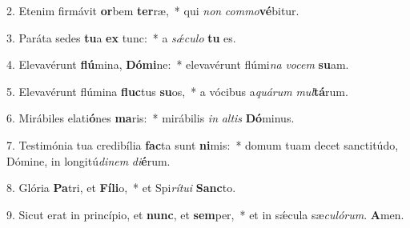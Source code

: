 2. Etenim firmávit \textbf{or}bem \textbf{ter}ræ,~*  qui \textit{non} \textit{com}\textit{mo}\textbf{vé}bitur.\

3. Paráta sedes \textbf{tu}a \textbf{ex} tunc:~*  a \textit{sǽ}\textit{cu}\textit{lo} \textbf{tu} es.\

4. Elevavérunt \textbf{flú}mina, \textbf{Dó}\textbf{mi}ne:~*  elevavérunt flúmi\textit{na} \textit{vo}\textit{cem} \textbf{su}am.\

5. Elevavérunt flúmina \textbf{fluc}tus \textbf{su}os,~*  a vócibus a\textit{quá}\textit{rum} \textit{mul}\textbf{tá}rum.\

6. Mirábiles elati\textbf{ó}nes \textbf{ma}ris:~*  mirábilis \textit{in} \textit{al}\textit{tis} \textbf{Dó}minus.\

7. Testimónia tua credibília \textbf{fac}ta sunt \textbf{ni}mis:~*  domum tuam decet sanctitúdo, Dómine, in longitú\textit{di}\textit{nem} \textit{di}\textbf{é}rum.\

8. Glória \textbf{Pa}tri, et \textbf{Fí}\textbf{li}o,~*  et Spi\textit{rí}\textit{tu}\textit{i} \textbf{Sanc}to.\

9. Sicut erat in princípio, et \textbf{nunc}, et \textbf{sem}per,~*  et in sǽcula sæ\textit{cu}\textit{ló}\textit{rum}. \textbf{A}men.\

